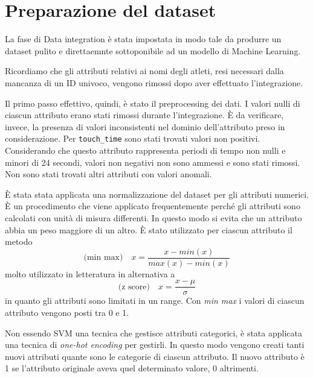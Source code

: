 \section{Preparazione del dataset}

La fase di Data integration è stata impostata in modo tale da produrre un dataset pulito e direttaemnte sottoponibile ad un modello di Machine Learning.

Ricordiamo che gli attributi relativi ai nomi degli atleti, resi necessari dalla mancanza di un ID univoco, vengono rimossi dopo aver effettuato l'integrazione.

Il primo passo effettivo, quindi, è stato il preprocessing dei dati. I valori nulli di ciascun attributo erano stati rimossi durante l’integrazione. È da verificare, invece, la presenza di valori inconsistenti nel dominio dell’attributo preso in considerazione.
Per \texttt{touch\_time} sono stati trovati valori non positivi. Considerando che questo attributo rappresenta periodi di tempo non nulli e minori di 24 secondi, valori non negativi non sono ammessi e sono stati rimossi.
Non sono stati trovati altri attributi con valori anomali.

\par

È stata stata applicata una normalizzazione del dataset per gli attributi numerici. È un procedimento che viene applicato frequentemente perché gli attributi sono calcolati con unità di misura differenti. In questo modo si evita che un attributo abbia un peso maggiore di un altro. È stato utilizzato per ciascun attributo il metodo
\begin{equation}
\text{(min max)}\quad x = \dfrac{x - min(x)}{max(x) - min(x)}
\end{equation}
molto utilizzato in letteratura in alternativa a
\begin{equation}
\text{(z score)}\quad x = \dfrac{x - \mu}{\sigma}
\end{equation}
 in quanto gli attributi sono limitati in un range. Con \textit{min max} i valori di ciascun attributo vengono posti tra 0 e 1.

\par
Non essendo SVM una tecnica che gestisce attributi categorici, è stata applicata una tecnica di \textit{one-hot encoding} per gestirli. In questo modo vengono creati tanti nuovi attributi quante sono le categorie di ciascun attributo. Il nuovo attributo è 1 se l’attributo originale aveva quel determinato valore, 0 altrimenti.